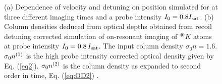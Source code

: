 \documentclass[12pt]{iopart}
\begin{document}
\begin{figure}
\caption{(a) Dependence of velocity and detuning on position simulated for \K{} at three different imaging times and a probe intensity $I_0=0.8 I_{\rm{sat}}$. (b) Column densities deduced from optical depths obtained from recoil detuning corrected simulation of on-resonant imaging of $^{40}K$ atoms at probe intensity $I_0=0.8\, I_{\rm{sat}}$. The input column density $\sigma_0 n=1.6$. $\sigma_0 n^{\rm{(1)}}$ is the high probe intensity corrected optical density given by Eq. (\ref{eq2}). $\sigma_0 n^{\rm{(2)}}$ is the column density as expanded to second order in time, Eq. (\ref{eq:OD2}) \cite{LJLthesis}.}
\label{fig:expos}
\end{figure}
\end{document}
